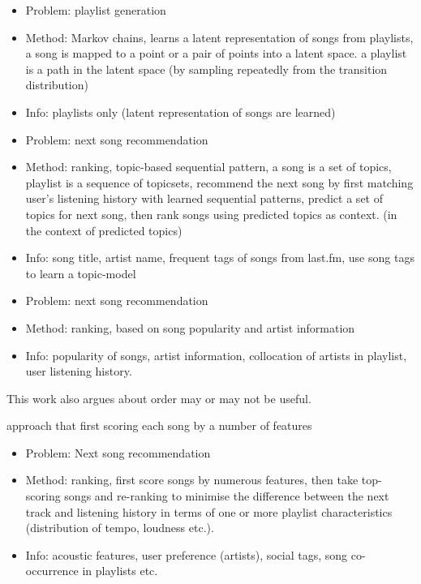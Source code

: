 \cite{chen2012playlist}
\begin{itemize}
\item Problem: playlist generation
\item Method: Markov chains, learns a latent representation of songs from playlists, a song is mapped to a point or a pair of points into a latent space.
a playlist is a path in the latent space (by sampling repeatedly from the transition distribution)
\item Info: playlists only (latent representation of songs are learned)
\end{itemize}


\cite{hariri2012context}
\begin{itemize}
\item Problem: next song recommendation 
\item Method: ranking, topic-based sequential pattern, a song is a set of topics, playlist is a sequence of topicsets, recommend the next song by first matching user's listening history with learned sequential patterns, predict a set of topics for next song, then rank songs using predicted topics as context. (in the context of predicted topics)
\item Info: song title, artist name, frequent tags of songs from last.fm, use song tags to learn a topic-model
\end{itemize}


\cite{bonnin2013evaluating}
\begin{itemize}
\item Problem: next song recommendation 
\item Method: ranking, based on song popularity and artist information
\item Info: popularity of songs, artist information, collocation of artists in playlist, user listening history.
\end{itemize}
This work also argues about order may or may not be useful.


\cite{jannach2015beyond} approach that first scoring each song by a number of features
\begin{itemize}
\item Problem: Next song recommendation
\item Method: ranking, first score songs by numerous features, then take top-scoring songs and re-ranking to minimise the difference between the next track and listening history in terms of one or more playlist characteristics (\eg distribution of tempo, loudness etc.).
\item Info: acoustic features, user preference (\eg artists), social tags, song co-occurrence in playlists etc.
\end{itemize}


